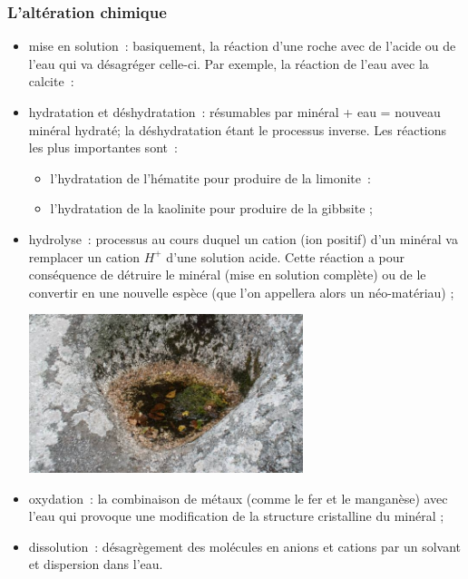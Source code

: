\documentclass[a4paper,11pt]{article}
\begin{document}
\subsubsection{L'altération chimique}
\begin{itemize}
  \item mise en solution~: basiquement, la réaction d'une roche avec de l'acide ou de l'eau qui va désagréger celle-ci.
  Par exemple, la réaction de l'eau avec la calcite~:
  \medbreak
  \begin{center}
  \end{center}
  \medbreak
  \item hydratation et déshydratation~: résumables par minéral + eau = nouveau minéral hydraté; la déshydratation étant le processus inverse.
  Les réactions les plus importantes sont~:
  \begin{itemize}
    \item l'hydratation de l'hématite pour produire de la limonite~:
    \medbreak
    \begin{center}
    \end{center}
    \medbreak
    \item l'hydratation de la kaolinite pour produire de la gibbsite ;
  \end{itemize}

  \item hydrolyse~: processus au cours duquel un cation (ion positif) d'un minéral va remplacer un cation $H^+$ d'une solution acide.
  Cette réaction a pour conséquence de détruire le minéral (mise en solution complète) ou de le convertir en une nouvelle espèce (que l'on appellera alors un néo-matériau) ;
  \medbreak
  \begin{center}
    \includegraphics[width=8cm]{Images/Erosion/hydrolyse.jpg}
  \end{center}
  \medbreak
  \item oxydation~: la combinaison de métaux (comme le fer et le manganèse) avec l'eau qui provoque une modification de la structure cristalline du minéral ;
  \item dissolution~: désagrègement des molécules en anions et cations par un solvant et dispersion dans l'eau.
\end{itemize}
\end{document}
